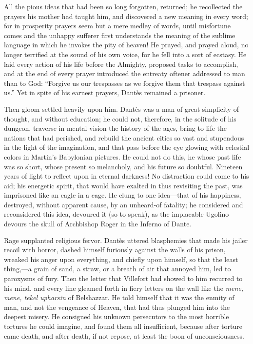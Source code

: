 All the pious ideas that had been so long forgotten, returned; he
recollected the prayers his mother had taught him, and discovered a new
meaning in every word; for in prosperity prayers seem but a mere medley
of words, until misfortune comes and the unhappy sufferer first
understands the meaning of the sublime language in which he invokes the
pity of heaven! He prayed, and prayed aloud, no longer terrified at the
sound of his own voice, for he fell into a sort of ecstasy. He laid
every action of his life before the Almighty, proposed tasks to
accomplish, and at the end of every prayer introduced the entreaty
oftener addressed to man than to God: “Forgive us our trespasses as we
forgive them that trespass against us.” Yet in spite of his earnest
prayers, Dantès remained a prisoner.

Then gloom settled heavily upon him. Dantès was a man of great
simplicity of thought, and without education; he could not, therefore,
in the solitude of his dungeon, traverse in mental vision the history
of the ages, bring to life the nations that had perished, and rebuild
the ancient cities so vast and stupendous in the light of the
imagination, and that pass before the eye glowing with celestial colors
in Martin’s Babylonian pictures. He could not do this, he whose past
life was so short, whose present so melancholy, and his future so
doubtful. Nineteen years of light to reflect upon in eternal darkness!
No distraction could come to his aid; his energetic spirit, that would
have exalted in thus revisiting the past, was imprisoned like an eagle
in a cage. He clung to one idea—that of his happiness, destroyed,
without apparent cause, by an unheard-of fatality; he considered and
reconsidered this idea, devoured it (so to speak), as the implacable
Ugolino devours the skull of Archbishop Roger in the Inferno of Dante.

Rage supplanted religious fervor. Dantès uttered blasphemies that made
his jailer recoil with horror, dashed himself furiously against the
walls of his prison, wreaked his anger upon everything, and chiefly
upon himself, so that the least thing,—a grain of sand, a straw, or a
breath of air that annoyed him, led to paroxysms of fury. Then the
letter that Villefort had showed to him recurred to his mind, and every
line gleamed forth in fiery letters on the wall like the \textit{mene, mene,
tekel upharsin} of Belshazzar. He told himself that it was the enmity
of man, and not the vengeance of Heaven, that had thus plunged him into
the deepest misery. He consigned his unknown persecutors to the most
horrible tortures he could imagine, and found them all insufficient,
because after torture came death, and after death, if not repose, at
least the boon of unconsciousness.

